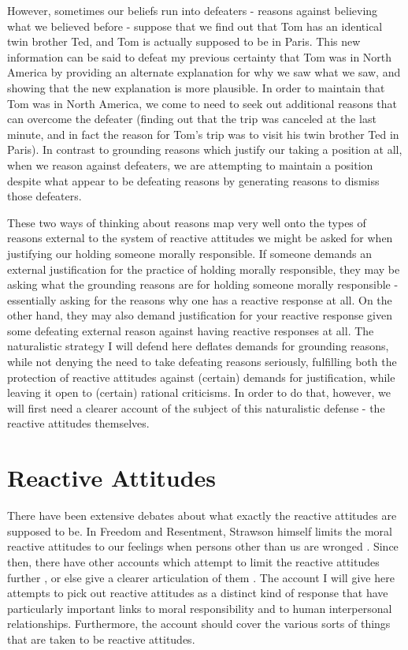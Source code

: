 \documentclass[phd,12pt,oneside,paper=letterpaper]{ubcthesis}
\begin{document}
However, sometimes our beliefs run into defeaters - reasons against believing what we believed before - suppose that we find out that Tom has an identical twin brother Ted, and Tom is actually supposed to be in Paris. This new information can be said to defeat my previous certainty that Tom was in North America by providing an alternate explanation for why we saw what we saw, and showing that the new explanation is more plausible. In order to maintain that Tom was in North America, we come to need to seek out additional reasons that can overcome the defeater (finding out that the trip was canceled at the last minute, and in fact the reason for Tom's trip was to visit his twin brother Ted in Paris). In contrast to grounding reasons which justify our taking a position at all, when we reason against defeaters, we are attempting to maintain a position despite what appear to be defeating reasons by generating reasons to dismiss those defeaters. 

These two ways of thinking about reasons map very well onto the types of reasons external to the system of reactive attitudes we might be asked for when justifying our holding someone morally responsible. If someone demands an external justification for the practice of holding morally responsible, they may be asking what the grounding reasons are for holding someone morally responsible - essentially asking for the reasons why one has a reactive response at all. On the other hand, they may also demand justification for your reactive response given some defeating external reason against having reactive responses at all. The naturalistic strategy I will defend here deflates demands for grounding reasons, while not denying the need to take defeating reasons seriously, fulfilling both the protection of reactive attitudes against (certain) demands for justification, while leaving it open to (certain) rational criticisms.  In order to do that, however, we will first need a clearer account of the subject of this naturalistic defense - the reactive attitudes themselves.

\section{Reactive Attitudes}
There have been extensive debates about what exactly the reactive attitudes are supposed to be. In Freedom and Resentment, Strawson himself limits the moral reactive attitudes to our feelings when persons other than us are wronged \citep[p.14]{strawsonp1974}. Since then, there have other accounts which attempt to limit the reactive attitudes further \citep{wallace1994}, or else give a clearer articulation of them \citep{bennett1980}. The account I will give here attempts to pick out reactive attitudes as a distinct kind of response that have particularly important links to moral responsibility and to human interpersonal relationships. Furthermore, the account should cover the various sorts of things that are taken to be reactive attitudes. 
\end{document}

